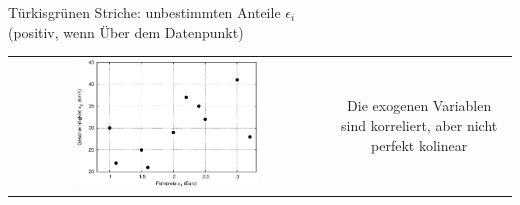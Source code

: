 \documentclass[a4paper]{foils}
\begin{document}
\begin{landscape}
\begin{center}


\vspace{0em}  




\vspace{-1em}


T\"urkisgr\"unen Striche:  unbestimmten Anteile
$\epsilon_i$\\ (positiv, wenn \"Uber dem Datenpunkt)

\newpage
\vspace{0em}

\begin{tabular}{cc}
\includegraphics[width=0.6\textwidth]{figsRegr/scatterplot_x1x2.eps}
&
\parbox{0.4\textwidth}{\vspace{-10em}

Die 
exogenen Variablen sind korreliert, aber nicht perfekt kolinear}
\end{tabular}

\vspace{0em}


\end{center}
\end{landscape}
\end{document}
